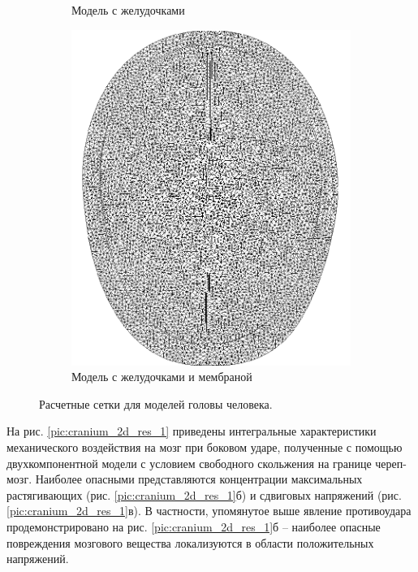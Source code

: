 \begin{figure}[h]
\begin{subfigure}[b]{0.3\textwidth}
\caption{Модель с желудочками}
\end{subfigure}
\begin{subfigure}[b]{0.3\textwidth}
\centering
\includegraphics[width=\textwidth]{png/cranium/2d-problem-mesh-3.png}
\caption{Модель с желудочками и мембраной}
\end{subfigure}
\caption{Расчетные сетки для моделей головы человека.}
\label{pic:cranium_2d_mesh}
\end{figure}

На рис. \ref{pic:cranium_2d_res_1} приведены интегральные характеристики механического воздействия на мозг при боковом ударе, полученные с помощью двухкомпонентной модели с условием свободного скольжения на границе череп-мозг. Наиболее опасными представляются концентрации максимальных растягивающих (рис. \ref{pic:cranium_2d_res_1}б) и сдвиговых напряжений (рис. \ref{pic:cranium_2d_res_1}в). В частности, упомянутое выше явление противоудара продемонстрировано на рис. \ref{pic:cranium_2d_res_1}б -- наиболее опасные повреждения мозгового вещества локализуются в области положительных напряжений.

